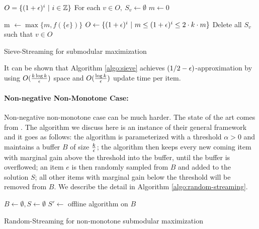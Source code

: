 \begin{algorithm}[H]
\DontPrintSemicolon %
$O = \{(1 + \epsilon)^i~|~i\in \mathbb{Z}\}$\;
\;
For each $v\in O, ~S_v \gets \emptyset$\;
$m \gets 0$\;

 {
  m $\gets \max\{m, f(\{e\})\}$\;
  $O\gets \{(1 + \epsilon)^i~|~m \leq (1 + \epsilon)^i \leq 2\cdot k \cdot m\}$\;
  Delete all $S_v$ such that $v \in O$\;
}
\;
\caption{{\sc Sieve-Streaming} for submodular maximization}
\label{algo:sieve}
\end{algorithm}

It can be shown that Algorithm \ref{algo:sieve} achieves $(1/2-\epsilon)$-approximation by using $O(\frac{k \log k}{\epsilon})$ space and $O(\frac{\log k}{\epsilon})$ update time per item.


\paragraph{Non-negative Non-Monotone Case:} Non-negative non-monotone case can be much harder. The state of the art comes from \cite{CGQ15}. The algorithm we discuss here is an instance of their general framework and it goes as follows: the algorithm is parameterized with a threshold $\alpha > 0$ and  maintains a buffer $B$ of size $\frac{k}{\epsilon}$; the algorithm then keeps every new coming item with marginal gain above the threshold into the buffer, until the buffer is overflowed; an item $e$ is then randomly sampled from $B$ and added to the solution $S$; all other items with marginal gain below the threshold will be removed from $B$.   We describe the detail in Algorithm \ref{algo:random-streaming}.

\begin{algorithm}[H]
\DontPrintSemicolon %
$B\gets \emptyset, S\gets \emptyset$\;
 {
}
$S' \gets$ offline algorithm on $B$\;
\;
\caption{{\sc Random-Streaming} for non-monotone submodular maximization}
\label{algo:random-streaming}
\end{algorithm}

